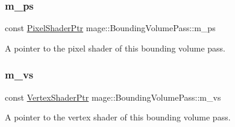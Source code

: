 \subsubsection{\texorpdfstring{m\+\_\+ps}{m\_ps}}
{\footnotesize\ttfamily const \hyperlink{namespacemage_acbec875bb5e5e085e32ed244a24d2b6f}{Pixel\+Shader\+Ptr} mage\+::\+Bounding\+Volume\+Pass\+::m\+\_\+ps\hspace{0.3cm}{\ttfamily [private]}}

A pointer to the pixel shader of this bounding volume pass. \hypertarget{classmage_1_1_bounding_volume_pass_a297862218108862e3435381613738322}{}\label{classmage_1_1_bounding_volume_pass_a297862218108862e3435381613738322} 
\subsubsection{\texorpdfstring{m\+\_\+vs}{m\_vs}}
{\footnotesize\ttfamily const \hyperlink{namespacemage_a1f19b094f771e30bc0a6c1cebcc0dd58}{Vertex\+Shader\+Ptr} mage\+::\+Bounding\+Volume\+Pass\+::m\+\_\+vs\hspace{0.3cm}{\ttfamily [private]}}

A pointer to the vertex shader of this bounding volume pass. 